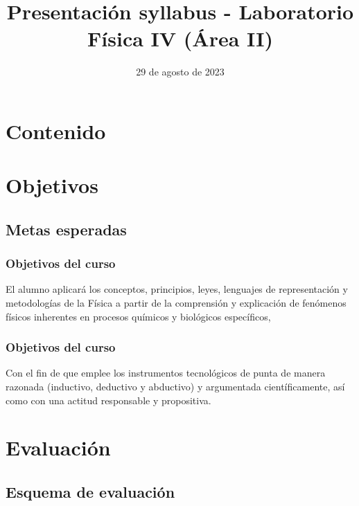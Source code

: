 \documentclass[14pt]{beamer}
\title{\Large{Presentación syllabus - Laboratorio} \\ \normalsize{Física IV (Área II)}}
\date{29 de agosto de 2023}
\begin{document}
\maketitle

\section*{Contenido}

\section{Objetivos}
\subsection{Metas esperadas}

\begin{frame}
\frametitle{Objetivos del curso}
El alumno aplicará los conceptos, principios, leyes, lenguajes de representación y metodologías de la Física a partir de la comprensión y explicación de fenómenos físicos inherentes en procesos químicos y biológicos específicos, 
\end{frame}
\begin{frame}
\frametitle{Objetivos del curso}
Con el fin de que emplee los instrumentos tecnológicos de punta de manera razonada (inductivo, deductivo y abductivo) y argumentada científicamente, así como con una actitud responsable y propositiva.
\end{frame}

\section{Evaluación}
\subsection{Esquema de evaluación}
\end{document}
